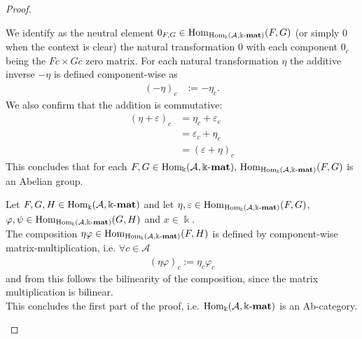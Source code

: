 \begin{proof}
\begin{enumerate}
\begin{subproof}[Proof of (i)]
We identify as the neutral element $0_{F,G} \in \mathrm{Hom}_{\mathrm{Hom_{\Bbbk}}(\mathcal{A},\Bbbk\textnormal{-}\mathbf{mat})}(F,G)$ (or simply $0$ when the context is clear)
the natural transformation $0$ with each component $0_{c}$ being the $Fc\times Gc$ zero matrix.
For each natural transformation $\eta$ the additive inverse $-\eta$ is defined component-wise as
\begin{align}
(-\eta)_{c} &:= -\eta_{c}.
\end{align}
We also confirm that the addition is commutative:
\begin{align}
(\eta+\varepsilon)_{c} &= \eta_{c} + \varepsilon_{c}\\
    &= \varepsilon_{c} + \eta_{c}\\
    &= (\varepsilon + \eta)_{c}
\end{align}
This concludes that for each $F, G \in \mathrm{Hom_{\Bbbk}}(\mathcal{A},\Bbbk\textnormal{-}\mathbf{mat}),\, \mathrm{Hom}_{\mathrm{Hom_{\Bbbk}}(\mathcal{A},\Bbbk\textnormal{-}\mathbf{mat})}(F,G)$ is an Abelian group.
\end{subproof}
\begin{subproof}[Proof of (ii)]
Let $F, G, H \in \mathrm{Hom_{\Bbbk}}(\mathcal{A},\Bbbk\textnormal{-}\mathbf{mat})$ and let $\eta, \varepsilon \in \mathrm{Hom}_{\mathrm{Hom_{\Bbbk}}(\mathcal{A},\Bbbk\textnormal{-}\mathbf{mat})}(F,G)$,
$\varphi, \psi \in \mathrm{Hom}_{\mathrm{Hom_{\Bbbk}}(\mathcal{A},\Bbbk\textnormal{-}\mathbf{mat})}(G,H)$ and $x \in \Bbbk$.\\
The composition $\eta\varphi \in \mathrm{Hom}_{\mathrm{Hom_{\Bbbk}}(\mathcal{A},\Bbbk\textnormal{-}\mathbf{mat})}(F,H)$ is defined by component-wise matrix-multiplication,
i.e. $\forall c \in \mathcal{A}$
\begin{align*}
(\eta\varphi)_{c} := \eta_{c}\varphi_{c}
\end{align*}
and from this follows the bilinearity of the composition, since the matrix multiplication is bilinear.\\
This concludes the first part of the proof, i.e. $\mathrm{Hom_{\Bbbk}}(\mathcal{A},\Bbbk\textnormal{-}\mathbf{mat})$ is an Ab-category.
\end{subproof}


\end{enumerate}
\end{proof}
